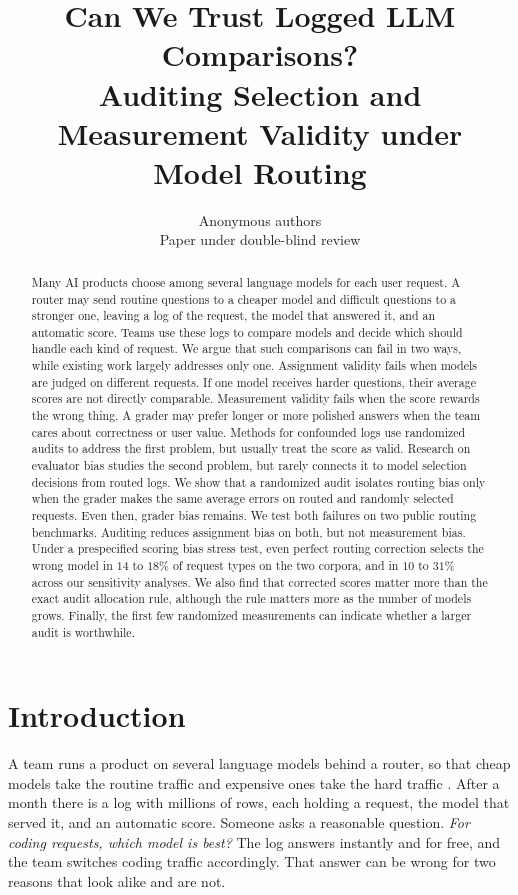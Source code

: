 \documentclass{article}
\title{Can We Trust Logged LLM Comparisons?\\Auditing Selection and Measurement Validity under Model Routing}
\author{Anonymous authors\\Paper under double-blind review}
\theoremstyle{plain}
\theoremstyle{remark}
\begin{document}
\maketitle

\begin{abstract}
Many AI products choose among several language models for each user request. A router may send
routine questions to a cheaper model and difficult questions to a stronger one, leaving a log of the
request, the model that answered it, and an automatic score. Teams use these logs to compare models
and decide which should handle each kind of request. We argue that such comparisons can fail in two
ways, while existing work largely addresses only one. Assignment validity fails when models are
judged on different requests. If one model receives harder questions, their average scores are not
directly comparable. Measurement validity fails when the score rewards the wrong thing. A grader may
prefer longer or more polished answers when the team cares about correctness or user value. Methods
for confounded logs use randomized audits to address the first problem, but usually treat the score
as valid. Research on evaluator bias studies the second problem, but rarely connects it to model
selection decisions from routed logs. We show that a randomized audit isolates routing bias only when
the grader makes the same average errors on routed and randomly selected requests. Even then, grader
bias remains. We test both failures on two public routing benchmarks. Auditing reduces assignment
bias on both, but not measurement bias. Under a prespecified scoring bias stress test, even perfect
routing correction selects the wrong model in $14$ to $18\%$ of request types on the two corpora, and
in $10$ to $31\%$ across our sensitivity analyses. We also find
that corrected scores matter more than the exact audit allocation rule, although the rule matters
more as the number of models grows. Finally, the first few randomized measurements can indicate
whether a larger audit is worthwhile.
\end{abstract}

\section{Introduction}\label{sec:intro}
A team runs a product on several language models behind a router, so that cheap models take the
routine traffic and expensive ones take the hard traffic
\citep{chen2023frugalgpt,ding2024hybrid,ong2024routellm}. After a month there is a log with millions
of rows, each holding a request, the model that served it, and an automatic score. Someone asks a
reasonable question. \emph{For coding requests, which model is best?} The log answers instantly and
for free, and the team switches coding traffic accordingly. That answer can be wrong for two reasons
that look alike and are not.
\end{document}
